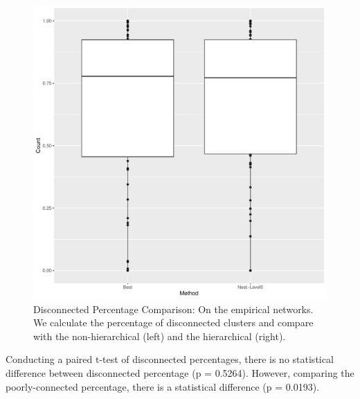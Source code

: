 \documentclass[aps,pre,superscriptaddress]{revtex4}
\begin{document}
\begin{figure}[ht]
	\includegraphics[width=\textwidth]{fig4.pdf}
	\caption{Disconnected Percentage Comparison:
		On the empirical networks.
		We calculate the percentage of disconnected clusters and compare with the non-hierarchical (left) and the hierarchical (right).
	}
	\label{figs:fig3}
\end{figure}

Conducting a paired t-test of disconnected percentages, there is no statistical difference between disconnected percentage (p = 0.5264).
However, comparing the poorly-connected percentage, there is a statistical difference (p = 0.0193).

\clearpage


\end{document}

